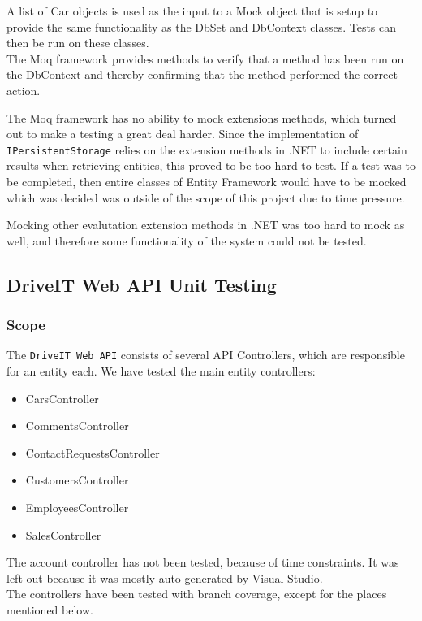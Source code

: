 A list of Car objects is used as the input to a Mock object that is setup to provide the same functionality as the DbSet and DbContext classes. Tests can then be run on these classes.\\
The Moq framework provides methods to verify that a method has been run on the DbContext and thereby confirming that the method performed the correct action. 

The Moq framework has no ability to mock extensions methods, which turned out to make a testing a great deal harder. Since the implementation of \texttt{IPersistentStorage} relies on the extension methods in .NET to include certain results when retrieving entities, this proved to be too hard to test. If a test was to be completed, then entire classes of Entity Framework would have to be mocked which was decided was outside of the scope of this project due to time pressure.

Mocking other evalutation extension methods in .NET was too hard to mock as well, and therefore some functionality of the system could not be tested.

\subsection{DriveIT Web API Unit Testing}
\subsubsection{Scope}
The \texttt{DriveIT Web API} consists of several API Controllers, which are responsible for an entity each. We have tested the main entity controllers:
\begin{itemize}
	\item CarsController
	\item CommentsController
	\item ContactRequestsController
	\item CustomersController
	\item EmployeesController
	\item SalesController
\end{itemize}
The account controller has not been tested, because of time constraints. It was left out because it was mostly auto generated by Visual Studio.\\

The controllers have been tested with branch coverage, except for the places mentioned below.
